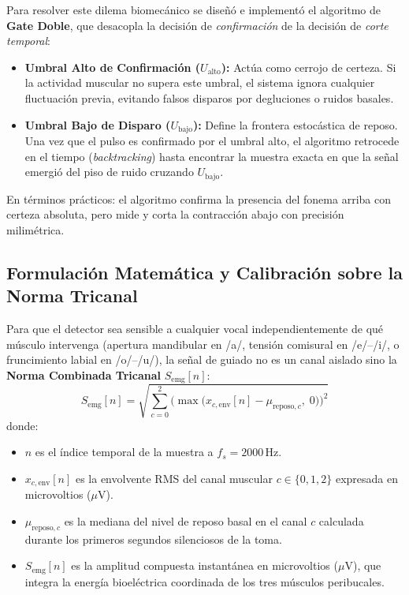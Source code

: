 \documentclass[11pt,a4paper]{article}
\begin{document}
Para resolver este dilema biomecánico se diseñó e implementó el algoritmo de \textbf{Gate Doble}, que desacopla la decisión de \textit{confirmación} de la decisión de \textit{corte temporal}:
\begin{itemize}
    \item \textbf{Umbral Alto de Confirmación ($U_{\text{alto}}$):} Actúa como cerrojo de certeza. Si la actividad muscular no supera este umbral, el sistema ignora cualquier fluctuación previa, evitando falsos disparos por degluciones o ruidos basales.
    \item \textbf{Umbral Bajo de Disparo ($U_{\text{bajo}}$):} Define la frontera estocástica de reposo. Una vez que el pulso es confirmado por el umbral alto, el algoritmo retrocede en el tiempo (\textit{backtracking}) hasta encontrar la muestra exacta en que la señal emergió del piso de ruido cruzando $U_{\text{bajo}}$.
\end{itemize}
En términos prácticos: el algoritmo confirma la presencia del fonema arriba con certeza absoluta, pero mide y corta la contracción abajo con precisión milimétrica.

\subsection{Formulación Matemática y Calibración sobre la Norma Tricanal}
\label{subsec:matematica_gate_doble}

Para que el detector sea sensible a cualquier vocal independientemente de qué músculo intervenga (apertura mandibular en /a/, tensión comisural en /e/--/i/, o fruncimiento labial en /o/--/u/), la señal de guiado no es un canal aislado sino la \textbf{Norma Combinada Tricanal} $S_{\text{emg}}[n]$:
\begin{equation}
    S_{\text{emg}}[n] = \sqrt{ \sum_{c=0}^2 \Big( \max\big( x_{c,\text{env}}[n] - \mu_{\text{reposo}, c}, \; 0 \big) \Big)^2 }
    \label{eq:norma_tricanal}
\end{equation}
donde:
\begin{itemize}
    \item $n$ es el índice temporal de la muestra a $f_s = 2000\,\text{Hz}$.
    \item $x_{c,\text{env}}[n]$ es la envolvente RMS del canal muscular $c \in \{0, 1, 2\}$ expresada en microvoltios ($\mu\text{V}$).
    \item $\mu_{\text{reposo}, c}$ es la mediana del nivel de reposo basal en el canal $c$ calculada durante los primeros segundos silenciosos de la toma.
    \item $S_{\text{emg}}[n]$ es la amplitud compuesta instantánea en microvoltios ($\mu\text{V}$), que integra la energía bioeléctrica coordinada de los tres músculos peribucales.
\end{itemize}
\end{document}
